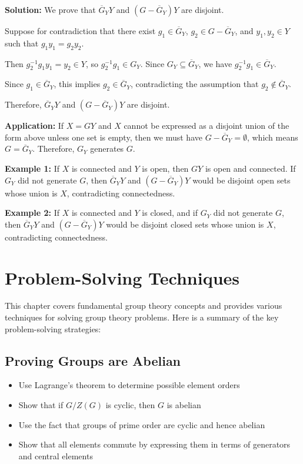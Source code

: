 \noindent\textbf{Solution:} We prove that $\overline{G}_Y Y$ and $(G - \overline{G}_Y)Y$ are disjoint.

Suppose for contradiction that there exist $g_1 \in \overline{G}_Y$, $g_2 \in G - \overline{G}_Y$, and $y_1, y_2 \in Y$ such that $g_1y_1 = g_2y_2$.

Then $g_2^{-1}g_1y_1 = y_2 \in Y$, so $g_2^{-1}g_1 \in G_Y$. Since $G_Y \subseteq \overline{G}_Y$, we have $g_2^{-1}g_1 \in \overline{G}_Y$.

Since $g_1 \in \overline{G}_Y$, this implies $g_2 \in \overline{G}_Y$, contradicting the assumption that $g_2 \notin \overline{G}_Y$.

Therefore, $\overline{G}_Y Y$ and $(G - \overline{G}_Y)Y$ are disjoint.

\textbf{Application:} If $X = GY$ and $X$ cannot be expressed as a disjoint union of the form above unless one set is empty, then we must have $G - \overline{G}_Y = \emptyset$, which means $G = \overline{G}_Y$. Therefore, $G_Y$ generates $G$.

\textbf{Example 1:} If $X$ is connected and $Y$ is open, then $GY$ is open and connected. If $G_Y$ did not generate $G$, then $\overline{G}_Y Y$ and $(G - \overline{G}_Y)Y$ would be disjoint open sets whose union is $X$, contradicting connectedness.

\textbf{Example 2:} If $X$ is connected and $Y$ is closed, and if $G_Y$ did not generate $G$, then $\overline{G}_Y Y$ and $(G - \overline{G}_Y)Y$ would be disjoint closed sets whose union is $X$, contradicting connectedness.

\section{Problem-Solving Techniques}

This chapter covers fundamental group theory concepts and provides various techniques for solving group theory problems. Here is a summary of the key problem-solving strategies:

\subsection*{Proving Groups are Abelian}
\begin{itemize}
\item Use Lagrange's theorem to determine possible element orders
\item Show that if $G/Z(G)$ is cyclic, then $G$ is abelian
\item Use the fact that groups of prime order are cyclic and hence abelian
\item Show that all elements commute by expressing them in terms of generators and central elements
\end{itemize}

